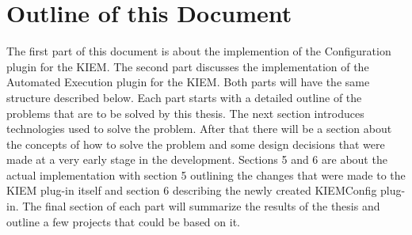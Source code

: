 \section{Outline of this Document}
\label{sec:intro/Outline}
The first part of this document is about the implemention of the Configuration plugin for the \ac{KIEM}.
The second part discusses the implementation of the Automated Execution plugin for the \ac{KIEM}. Both
parts will have the same structure described below.
Each part starts with a detailed outline of the problems that are to be solved by this thesis.
The next section introduces technologies used to solve the problem.
After that there will be a section about the concepts of how to solve the problem and some
design decisions that were made at a very early stage in the development.
Sections 5 and 6 are about the actual implementation with section 5 outlining the changes
that were made to the \ac{KIEM} plug-in itself and section 6 describing the newly created
\ac{KIEMConfig} plug-in.
The final section of each part will summarize the results of the thesis and outline
a few projects that could be based on it.








